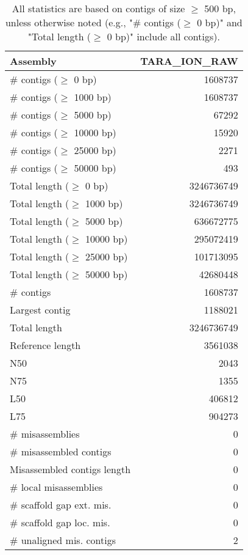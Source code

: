 \documentclass[12pt,a4paper]{article}
\begin{document}
\begin{table}[ht]
\begin{center}
\caption{All statistics are based on contigs of size $\geq$ 500 bp, unless otherwise noted (e.g., "\# contigs ($\geq$ 0 bp)" and "Total length ($\geq$ 0 bp)" include all contigs).}
\begin{tabular}{|l*{1}{|r}|}
\hline
Assembly & TARA\_ION\_RAW \\ \hline
\# contigs ($\geq$ 0 bp) & 1608737 \\ \hline
\# contigs ($\geq$ 1000 bp) & 1608737 \\ \hline
\# contigs ($\geq$ 5000 bp) & 67292 \\ \hline
\# contigs ($\geq$ 10000 bp) & 15920 \\ \hline
\# contigs ($\geq$ 25000 bp) & 2271 \\ \hline
\# contigs ($\geq$ 50000 bp) & 493 \\ \hline
Total length ($\geq$ 0 bp) & 3246736749 \\ \hline
Total length ($\geq$ 1000 bp) & 3246736749 \\ \hline
Total length ($\geq$ 5000 bp) & 636672775 \\ \hline
Total length ($\geq$ 10000 bp) & 295072419 \\ \hline
Total length ($\geq$ 25000 bp) & 101713095 \\ \hline
Total length ($\geq$ 50000 bp) & 42680448 \\ \hline
\# contigs & 1608737 \\ \hline
Largest contig & 1188021 \\ \hline
Total length & 3246736749 \\ \hline
Reference length & 3561038 \\ \hline
N50 & 2043 \\ \hline
N75 & 1355 \\ \hline
L50 & 406812 \\ \hline
L75 & 904273 \\ \hline
\# misassemblies & 0 \\ \hline
\# misassembled contigs & 0 \\ \hline
Misassembled contigs length & 0 \\ \hline
\# local misassemblies & 0 \\ \hline
\# scaffold gap ext. mis. & 0 \\ \hline
\# scaffold gap loc. mis. & 0 \\ \hline
\# unaligned mis. contigs & 2 \\ \hline

\end{tabular}
\end{center}
\end{table}
\end{document}
